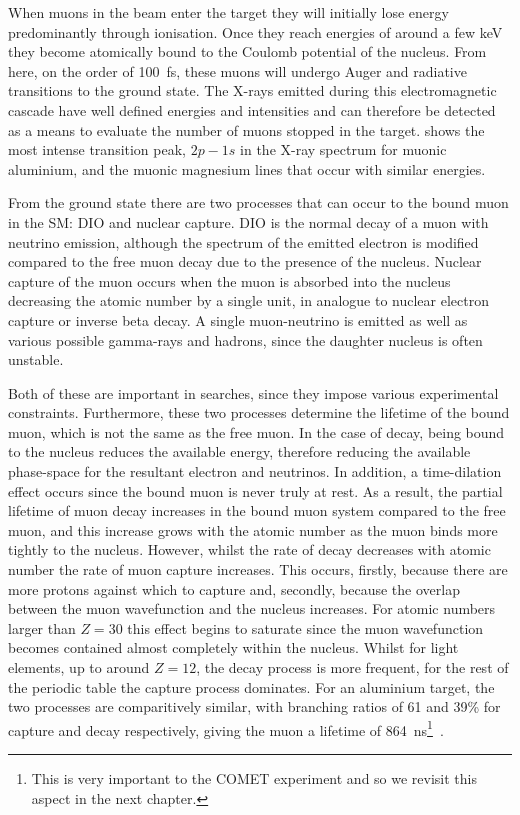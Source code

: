 When muons in the beam enter the target they will initially lose energy predominantly through ionisation.
Once they reach energies of around a few keV they become atomically bound to the Coulomb potential of the nucleus.
From here, on the order of 100~fs, these muons will undergo Auger and radiative transitions to the ground state.
The X-rays emitted during this electromagnetic cascade have well defined energies and intensities and can therefore be detected as a means to evaluate the number of muons stopped in the target.
 shows the most intense transition peak, $2p-1s$ in the X-ray spectrum for muonic aluminium, and the muonic magnesium lines that occur with similar energies.

\FigMuonicXrays
From the ground state there are two processes that can occur to the bound muon in the \ac{SM}:
\acf{DIO} and nuclear capture.
\ac{DIO} is the normal decay of a muon with neutrino emission, although the spectrum of the emitted electron is modified compared to the free muon decay due to the presence of the nucleus.
Nuclear capture of the muon occurs when the muon is absorbed into the nucleus decreasing the atomic number by a single unit, in analogue to nuclear electron capture or inverse beta decay.
A single muon-neutrino is emitted as well as various possible gamma-rays and hadrons, since the daughter nucleus is often unstable.

Both of these are important in \mueconv searches, since they impose various experimental constraints.
Furthermore, these two processes determine the lifetime of the bound muon, which is not the same as the free muon.
In the case of decay, being bound to the nucleus reduces the available energy, therefore reducing the available phase-space for the resultant electron and neutrinos. 
In addition, a time-dilation effect occurs since the bound muon is never truly at rest. 
As a result, the partial lifetime of muon decay increases in the bound muon system compared to the free muon, and this increase grows with the atomic number as the muon binds more tightly to the nucleus.
However, whilst the rate of decay decreases with atomic number the rate of muon capture increases.
This occurs, firstly, because there are more protons against which to capture and, secondly, because the overlap between the muon wavefunction and the nucleus increases.
For atomic numbers larger than $Z=30$ this effect begins to saturate since the muon wavefunction becomes contained almost completely within the nucleus.
Whilst for light elements, up to around $Z=12$, the decay process is more frequent, for the rest of the periodic table the capture process dominates.
For an aluminium target, the two processes are comparitively similar, with branching ratios of 61 and 39\% for capture and decay respectively, giving the muon a lifetime of 864~ns\footnote{
This is very important to the COMET experiment and so we revisit this aspect in the next chapter.%
}~\cite{Measday2007Comparison}.

